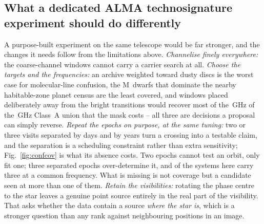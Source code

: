 \subsection{What a dedicated ALMA technosignature experiment should do
differently}
\label{sec:future}

A purpose-built experiment on the same telescope would be far stronger, and
the changes it needs follow from the limitations above. \emph{Channelise
finely everywhere:} the \NCoarse{} coarse-channel windows cannot carry a
carrier search at all.
\emph{Choose the targets and the frequencies:} an archive weighted toward
dusty discs is the worst case for molecular-line confusion, the M~dwarfs that
dominate the nearby habitable-zone planet census are the least covered, and
windows placed deliberately away from the bright transitions would recover
most of the \MkMaskAGHz\,GHz of the \CvUnionA\,GHz Class~A union that the
mask costs -- all three are decisions a
proposal can simply reverse. \emph{Repeat the epochs on purpose, at the same
tuning:} two or three visits separated by days and by years turn a crossing
into a testable claim, and the separation is a scheduling constraint rather
than extra sensitivity; Fig.~\ref{fig:confcov} is what its absence costs. Two
epochs cannot test an orbit, only fit one; three separated epochs
over-determine it, and \PaNSysThree{} of the \NSysClassA{} systems here carry
three at a common frequency. What is missing is not coverage but a candidate
seen at more than one of them.
\emph{Retain the visibilities:} rotating the phase centre to the star leaves a
genuine point source entirely in the real part of the visibility. That asks
whether the data contain a source \emph{where the star is}, which is a
stronger question than any rank
against neighbouring positions in an image.
